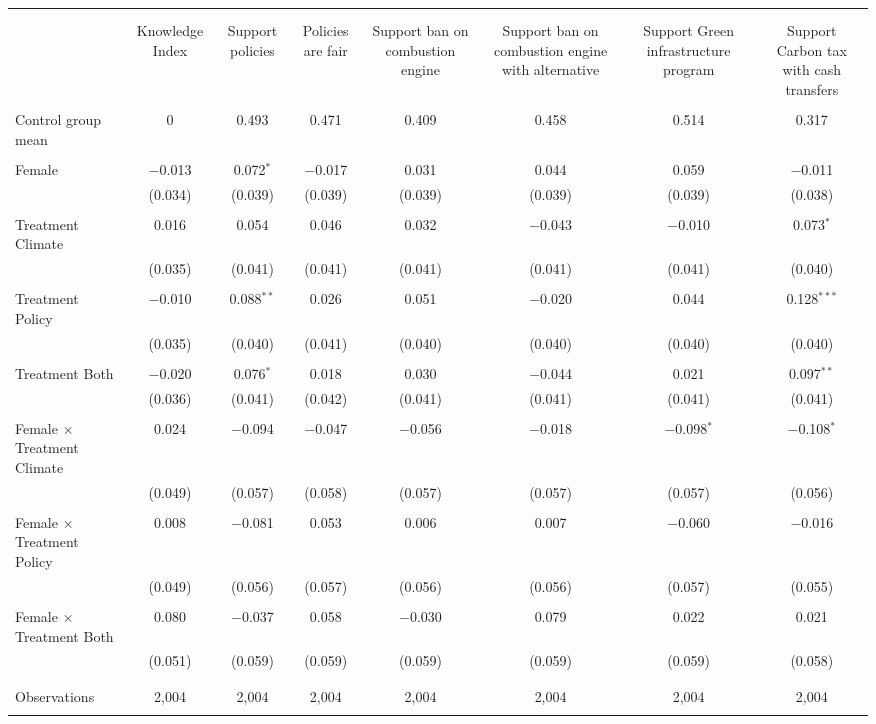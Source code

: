 
\begin{tabular}{@{\extracolsep{5pt}}lccccccc} 
\\[-1.8ex]\hline 
\hline \\[-1.8ex] 
\\[-1.8ex] & Knowledge Index & Support policies & Policies are fair & Support 
 ban on combustion engine & Support 
 ban on combustion engine with alternative & Support 
 Green infrastructure program & Support 
 Carbon tax with cash transfers \\ 
\hline \\[-1.8ex] 
 Control group mean & 0 & 0.493 & 0.471 & 0.409 & 0.458 & 0.514 & 0.317  \\ \hline \\[-1.8ex] Female & $-$0.013 & 0.072$^{*}$ & $-$0.017 & 0.031 & 0.044 & 0.059 & $-$0.011 \\ 
  & (0.034) & (0.039) & (0.039) & (0.039) & (0.039) & (0.039) & (0.038) \\ 
  & & & & & & & \\ 
 Treatment Climate & 0.016 & 0.054 & 0.046 & 0.032 & $-$0.043 & $-$0.010 & 0.073$^{*}$ \\ 
  & (0.035) & (0.041) & (0.041) & (0.041) & (0.041) & (0.041) & (0.040) \\ 
  & & & & & & & \\ 
 Treatment Policy & $-$0.010 & 0.088$^{**}$ & 0.026 & 0.051 & $-$0.020 & 0.044 & 0.128$^{***}$ \\ 
  & (0.035) & (0.040) & (0.041) & (0.040) & (0.040) & (0.040) & (0.040) \\ 
  & & & & & & & \\ 
 Treatment Both & $-$0.020 & 0.076$^{*}$ & 0.018 & 0.030 & $-$0.044 & 0.021 & 0.097$^{**}$ \\ 
  & (0.036) & (0.041) & (0.042) & (0.041) & (0.041) & (0.041) & (0.041) \\ 
  & & & & & & & \\ 
 Female $\times$ Treatment Climate & 0.024 & $-$0.094 & $-$0.047 & $-$0.056 & $-$0.018 & $-$0.098$^{*}$ & $-$0.108$^{*}$ \\ 
  & (0.049) & (0.057) & (0.058) & (0.057) & (0.057) & (0.057) & (0.056) \\ 
  & & & & & & & \\ 
 Female $\times$ Treatment Policy & 0.008 & $-$0.081 & 0.053 & 0.006 & 0.007 & $-$0.060 & $-$0.016 \\ 
  & (0.049) & (0.056) & (0.057) & (0.056) & (0.056) & (0.057) & (0.055) \\ 
  & & & & & & & \\ 
 Female $\times$ Treatment Both & 0.080 & $-$0.037 & 0.058 & $-$0.030 & 0.079 & 0.022 & 0.021 \\ 
  & (0.051) & (0.059) & (0.059) & (0.059) & (0.059) & (0.059) & (0.058) \\ 
  & & & & & & & \\ 
\hline \\[-1.8ex] 

Observations & 2,004 & 2,004 & 2,004 & 2,004 & 2,004 & 2,004 & 2,004 \\ 
\hline 
\hline \\[-1.8ex] 
\end{tabular} 